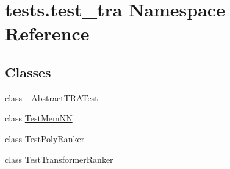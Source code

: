 \hypertarget{namespacetests_1_1test__tra}{}\section{tests.\+test\+\_\+tra Namespace Reference}
\label{namespacetests_1_1test__tra}
\subsection*{Classes}
\begin{DoxyCompactItemize}
\item 
class \hyperlink{classtests_1_1test__tra_1_1__AbstractTRATest}{\+\_\+\+Abstract\+T\+R\+A\+Test}
\item 
class \hyperlink{classtests_1_1test__tra_1_1TestMemNN}{Test\+Mem\+NN}
\item 
class \hyperlink{classtests_1_1test__tra_1_1TestPolyRanker}{Test\+Poly\+Ranker}
\item 
class \hyperlink{classtests_1_1test__tra_1_1TestTransformerRanker}{Test\+Transformer\+Ranker}
\end{DoxyCompactItemize}
